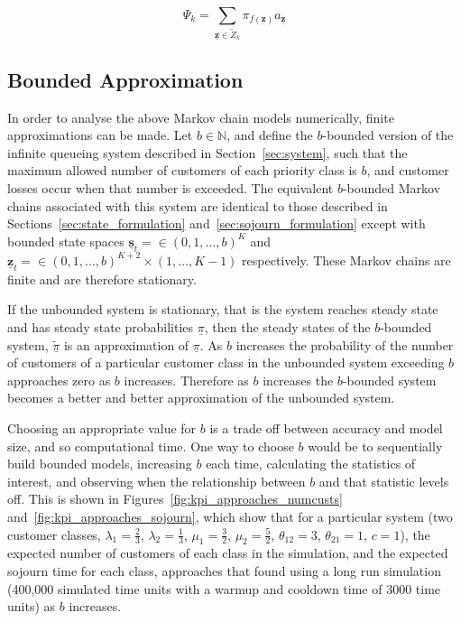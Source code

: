 \documentclass{article}
\begin{document}
\begin{equation}\label{eqn:mean_sojourn_class_k}
\Psi_k = \sum_{\underline{\mathbf{z}} \in \tilde{Z}_k} \pi_{f(\underline{\mathbf{z}})} a_{\underline{\mathbf{z}}}
\end{equation}



\subsection{Bounded Approximation}\label{sec:bound}
In order to analyse the above Markov chain models numerically, finite
approximations can be made. Let $b \in \mathbb{N}$, and define the $b$-bounded
version of the infinite queueing system described in Section~\ref{sec:system},
such that the maximum allowed number of customers of each priority class is $b$,
and customer losses occur when that number is exceeded. The equivalent
$b$-bounded Markov chains associated with this system are identical to those
described in Sections~\ref{sec:state_formulation}
and~\ref{sec:sojourn_formulation} except with bounded state spaces
$\underline{\mathbf{s}}_t = \in (0, 1, \dots, b)^K$ and
$\underline{\mathbf{z}}_t = \in (0, 1, \dots, b)^{K+2} \times (1, \dots, K - 1)$
respectively. These Markov chains are finite and are therefore stationary.

If the unbounded system is stationary, that is the system reaches steady state
and has steady state probabilities $\underline{\pi}$, then the steady states of
the $b$-bounded system, $\underline{\tilde{\pi}}$ is an approximation of
$\underline{\pi}$. As $b$ increases the probability of the number of
customers of a particular customer class in the unbounded system exceeding $b$
approaches zero as $b$ increases. Therefore as $b$ increases the $b$-bounded
system becomes a better and better approximation of the unbounded system.

Choosing an appropriate value for $b$ is a trade off between accuracy and model
size, and so computational time. One way to choose $b$ would be to
sequentially build bounded models, increasing $b$ each time, calculating the
statistics of interest, and observing when the relationship between $b$ and that
statistic levels off. This is shown in Figures~\ref{fig:kpi_approaches_numcusts}
and~\ref{fig:kpi_approaches_sojourn}, which show that for a particular system
(two customer classes, $\lambda_1=\frac{2}{3}$, $\lambda_2=\frac{1}{3}$,
$\mu_1=\frac{3}{2}$, $\mu_2=\frac{5}{2}$, $\theta_{12}=3$, $\theta_{21}=1$,
$c=1$), the expected number of customers of each class in the simulation, and
the expected sojourn time for each class, approaches that found using a long run
simulation (400,000 simulated time units with a warmup and cooldown time of 3000
time units) as $b$ increases.
\end{document}
